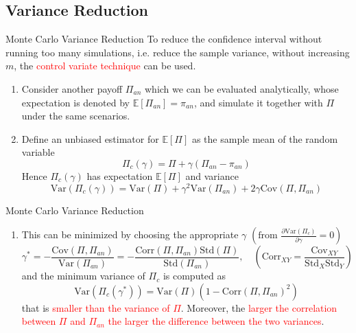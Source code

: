 \documentclass{beamer}
\begin{document}
\subsection{Variance Reduction}
\begin{frame}{Monte Carlo Variance Reduction}
  To reduce the confidence interval without running too many simulations, i.e. reduce the sample variance, without increasing $m$, the \textcolor{red}{control variate technique} can be used.
  \pause
  \begin{enumerate}
  \item<2-> Consider another payoff $\Pi_{an}$ which we can be evaluated analytically, whose expectation is denoted by $\mathbb{E}[\Pi_{an}] = \pi_{an}$, and simulate it together with $\Pi$ under the same scenarios.%
  \item<3-> Define an unbiased estimator for $\mathbb{E}[\Pi]$ as the sample mean of the random variable 
    \begin{equation*}
      \Pi_c(\gamma) = \Pi + \gamma(\Pi_{an} - \pi_{an})
    \end{equation*}
    Hence $\Pi_c(\gamma)$ has expectation $\mathbb{E}[\Pi]$ and variance
    \begin{equation*}
      \text{Var}(\Pi_c(\gamma)) = \text{Var}(\Pi) + \gamma^2 \text{Var}(\Pi_{an}) + 2\gamma \text{Cov}(\Pi, \Pi_{an})
    \end{equation*}
  \end{enumerate}
\end{frame}

\begin{frame}{Monte Carlo Variance Reduction}
	\begin{enumerate}\addtocounter{enumi}{2}
	\item This can be minimized by choosing the appropriate $\gamma$ $\left(\text{from }\frac{\partial \text{Var}(\Pi_c)}{\partial\gamma}=0\right)$
	\begin{equation*}
	\gamma^* = -\frac{\text{Cov}(\Pi, \Pi_{an})}{\text{Var}(\Pi_{an})} = -\frac{\text{Corr}(\Pi, \Pi_{an})\text{Std}(\Pi)}{\text{Std}(\Pi_{an})}, \quad \left(\text{Corr}_{XY}=\frac{\text{Cov}_{XY}}{\text{Std}_X \text{Std}_Y}\right)
	\end{equation*}
  	and the minimum variance of $\Pi_c$ is computed as
    \begin{equation*}
     \text{Var}(\Pi_c(\gamma^*)) = \text{Var}(\Pi)(1 - \text{Corr}(\Pi, \Pi_{an})^2)
    \end{equation*}
    that is \textcolor{red}{smaller than the variance of $\Pi$}. Moreover, the \textcolor{red}{larger the correlation between $\Pi$ and $\Pi_{an}$ the larger the difference between the two variances}.
  \end{enumerate}
\end{frame}
\end{document}
